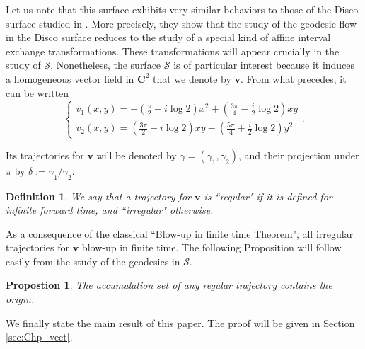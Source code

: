 \documentclass[11pt]{article}
\newtheorem{prop}[thm]{Propostion}
\newtheorem*{definition}{Definition}
\begin{document}
Let us note that this surface exhibits very similar behaviors to those of the Disco surface studied in \cite{BoulangerFougeronGhazouani}. More precisely, they show that the study of the geodesic flow in the Disco surface reduces to the study of a special kind of affine interval exchange transformations. These transformations will appear crucially in the study of $\mathcal{S}$. Nonetheless, the surface $\mathcal{S}$ is of particular interest because it induces a homogeneous vector field in $\mathbf{C}^{2}$ that we denote by $\mathbf{v}$. From what precedes, it can be written
\[
\left\{
\begin{array}{l}
\displaystyle v_{1}\left(x,y\right) = -\left(\frac{\pi}{2}+i\log2\right)x^{2}+\left(\frac{3\pi}{4}-\frac{i}{2}\log2\right)xy\\[3pt]
\displaystyle v_{2}\left(x,y\right) = \left(\frac{3\pi}{2}-i\log2\right)xy-\left(\frac{5\pi}{4}+\frac{i}{2}\log2\right)y^{2}
\end{array}
\right.
.
\]

Its trajectories for $\mathbf{v}$ will be denoted by $\gamma=\left(\gamma_{1},\gamma_{2}\right)$, and their projection under $\pi$ by $\delta:=\gamma_{1}/\gamma_{2}$.

\begin{definition}
    We say that a trajectory for $\mathbf{v}$ is ``regular" if it is defined for infinite forward time, and ``irregular" otherwise.
\end{definition}

As a consequence of the classical ``Blow-up in finite time Theorem", all irregular trajectories for $\mathbf{v}$ blow-up in finite time. The following Proposition will follow easily from the study of the geodesics in $\mathcal{S}$.

\begin{prop}
\label{prop:accumulation}
    The accumulation set of any regular trajectory contains the origin.
\end{prop}

We finally state the main result of this paper. The proof will be given in Section \ref{sec:Chp_vect}.
\end{document}
